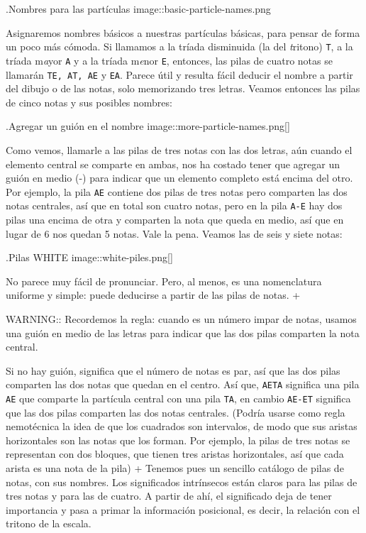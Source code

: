\documentclass[]{article}
\begin{document}
.Nombres para las partículas image::basic-particle-names.png

Asignaremos nombres básicos a nuestras partículas básicas, para pensar de forma un poco más cómoda. Si llamamos a la tríada disminuida (la del \emph{t}ritono) \texttt{T}, a la tríada m\emph{a}yor \texttt{A} y a la tríada m\emph{e}nor \texttt{E}, entonces, las pilas de cuatro notas se llamarán \texttt{TE,\ AT,\ AE} y \texttt{EA}. Parece útil y resulta fácil deducir el nombre a partir del dibujo o de las notas, solo memorizando tres letras. Veamos entonces las pilas de cinco notas y sus posibles nombres:

.Agregar un guión en el nombre image::more-particle-names.png{[}{]}

Como vemos, llamarle a las pilas de tres notas con las dos letras, aún cuando el elemento central se comparte en ambas, nos ha costado tener que agregar un guión en medio (-) para indicar que un elemento completo está encima del otro. Por ejemplo, la pila \texttt{AE} contiene dos pilas de tres notas pero comparten las dos notas centrales, así que en total son cuatro notas, pero en la pila \texttt{A-E} hay dos pilas una encima de otra y comparten la nota que queda en medio, así que en lugar de 6 nos quedan 5 notas. Vale la pena. Veamos las de seis y siete notas:

.Pilas WHITE image::white-piles.png{[}{]}

No parece muy fácil de pronunciar. Pero, al menos, es una nomenclatura uniforme y simple: puede deducirse a partir de las pilas de notas. +

WARNING:: Recordemos la regla: cuando es un número impar de notas, usamos una guión en medio de las letras para indicar que las dos pilas comparten la nota central.

Si no hay guión, significa que el número de notas es par, así que las dos pilas comparten las dos notas que quedan en el centro. Así que, \texttt{AETA} significa una pila \texttt{AE} que comparte la partícula central con una pila \texttt{TA}, en cambio \texttt{AE-ET} significa que las dos pilas comparten las dos notas centrales. (Podría usarse como regla nemotécnica la idea de que los cuadrados son intervalos, de modo que sus aristas horizontales son las notas que los forman. Por ejemplo, la pilas de tres notas se representan con dos bloques, que tienen tres aristas horizontales, así que cada arista es una nota de la pila) + Tenemos pues un sencillo catálogo de pilas de notas, con sus nombres. Los significados intrínsecos están claros para las pilas de tres notas y para las de cuatro. A partir de ahí, el significado deja de tener importancia y pasa a primar la información posicional, es decir, la relación con el tritono de la escala.
\end{document}
